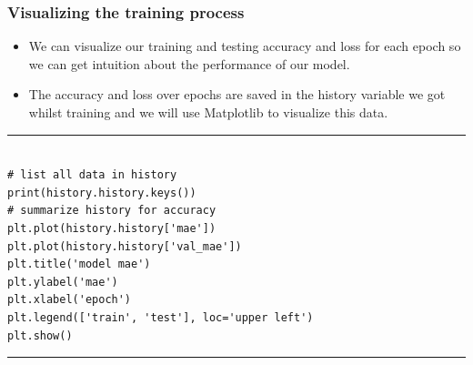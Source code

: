 \documentclass[11pt]{beamer}
\begin{document}
\begin{frame}[fragile]
\frametitle{Visualizing the training process }
\scriptsize
	\begin{itemize}
		\item We can visualize our training and testing accuracy and loss for each epoch so we can get intuition about the performance of our model. 
		\item The accuracy and loss over epochs are saved in the history variable we got whilst training and we will use Matplotlib to visualize this data.
	\end{itemize}

\rule{\textwidth}{1pt}
\begin{verbatim}

# list all data in history
print(history.history.keys())
# summarize history for accuracy
plt.plot(history.history['mae'])
plt.plot(history.history['val_mae'])
plt.title('model mae')
plt.ylabel('mae')
plt.xlabel('epoch')
plt.legend(['train', 'test'], loc='upper left')
plt.show()

\end{verbatim}
\rule{\textwidth}{1pt}
\end{frame}
%
%
\end{document}
